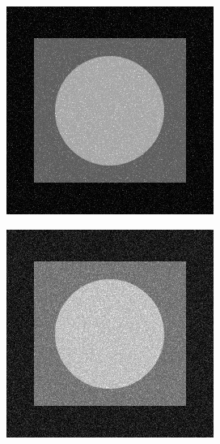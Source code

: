 \begin{figure}[h]
	\centering
	\begin{subfigure}[b]{0.25\linewidth}
		\includegraphics[width=\linewidth]{myfigure/p4/41-gaussian.png}
		\caption{}
		\label{fig:add_gaussian}
	\end{subfigure}
  	\begin{subfigure}[b]{0.25\linewidth}
		\includegraphics[width=\linewidth]{myfigure/p4/41-rayleigh.png}

\end{subfigure}
\end{figure}

